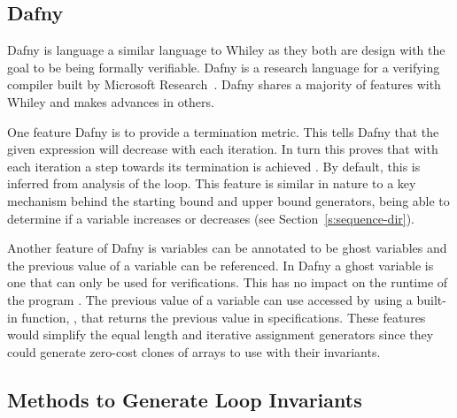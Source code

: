

\subsection{Dafny}

Dafny is language a similar language to Whiley as they both are design with the
goal to be  being formally verifiable.
Dafny is a research language for a verifying compiler built by Microsoft
Research~\cite{dafny-lang}.
Dafny shares a majority of features with Whiley and makes advances in others.

One feature Dafny is to provide a termination metric.
This tells Dafny that the given expression will decrease with each iteration. 
In turn this proves that with each iteration a step towards its termination is achieved \cite{dafny-started}\cite{dafny-lang}.
By default, this is inferred from analysis of the loop.
This feature is similar in nature to a key mechanism behind the starting bound and upper bound
generators, being able to determine if a variable increases or decreases
(see Section~\ref{s:sequence-dir}). 

Another feature of Dafny is variables can be annotated to be ghost variables
and the previous value of a variable can be referenced.
In Dafny a ghost variable is one that can only be used for verifications.
This has no impact on the runtime of the program \cite{dafny-started}\cite{dafny-lang}.
The previous value of a variable can use accessed by using a built-in
function, , that returns the previous value in specifications.
These features would simplify the equal length and iterative assignment
generators since they could generate zero-cost clones of arrays to use
with their invariants. 


\subsection{Methods to Generate Loop Invariants}

